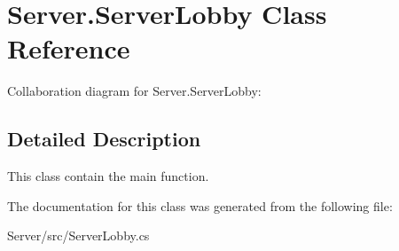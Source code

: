 \hypertarget{class_server_1_1_server_lobby}{}\section{Server.\+Server\+Lobby Class Reference}
\label{class_server_1_1_server_lobby}


Collaboration diagram for Server.\+Server\+Lobby\+:


\subsection{Detailed Description}
This class contain the main function. 

The documentation for this class was generated from the following file\+:\begin{DoxyCompactItemize}
\item 
Server/src/Server\+Lobby.\+cs\end{DoxyCompactItemize}
